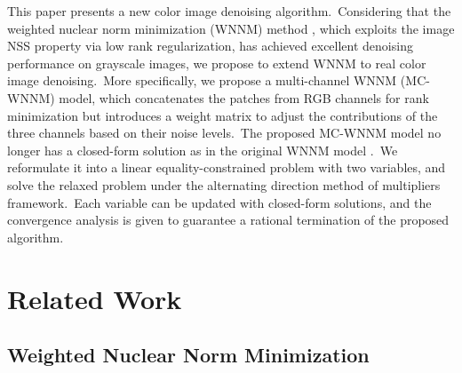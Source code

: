 \documentclass[10pt,twocolumn,letterpaper]{article}
\begin{document}
This paper presents a new color image denoising algorithm.\ Considering that the weighted nuclear norm minimization (WNNM) method \cite{wnnm,wnnmijcv}, which exploits the image NSS property via low rank regularization, has achieved excellent denoising performance on grayscale images, we propose to extend WNNM to real color image denoising.\ More specifically, we propose a multi-channel WNNM (MC-WNNM) model, which concatenates the patches from RGB channels for rank minimization but introduces a weight matrix to adjust the contributions of the three channels based on their noise levels.\ The proposed MC-WNNM model no longer has a closed-form solution as in the original WNNM model \cite{wnnmijcv}.\ We reformulate it into a linear equality-constrained problem with two variables, and solve the relaxed problem under the alternating direction method of multipliers \cite{admm} framework.\ Each variable can be updated with closed-form solutions, and the convergence analysis is given to guarantee a rational termination of the proposed algorithm.

\vspace{-1mm}
\section{Related Work}

\subsection{Weighted Nuclear Norm Minimization}
\vspace{-1mm}
\end{document}
